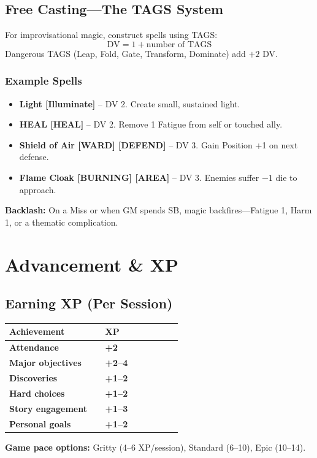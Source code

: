 \documentclass[10pt,twocolumn]{article} %
\begin{document}
\subsection{Free Casting---The TAGS System}
For improvisational magic, construct spells using TAGS:
\[
\text{DV} = 1 + \text{number of TAGS}
\]
Dangerous TAGS (Leap, Fold, Gate, Transform, Dominate) add $+2$ DV.

\subsubsection{Example Spells}
\begin{itemize}[leftmargin=*]
    \item \textbf{Light [Illuminate]} -- DV 2. Create small, sustained light.
    \item \textbf{HEAL [HEAL]} -- DV 2. Remove 1 Fatigue from self or touched ally.
    \item \textbf{Shield of Air [WARD] [DEFEND]} -- DV 3. Gain Position +1 on next defense.
    \item \textbf{Flame Cloak [BURNING] [AREA]} -- DV 3. Enemies suffer $-1$ die to approach.
\end{itemize}
\textbf{Backlash:} On a Miss or when GM spends SB, magic backfires---Fatigue 1, Harm 1, or a thematic complication.

\section{Advancement \& XP}

\subsection{Earning XP (Per Session)}
\begin{coretable}[XP Breakdown]
\begin{tabular}{>{\bfseries}p{0.5\linewidth} >{\bfseries}p{0.4\linewidth}}
\toprule
\textbf{Achievement} & \textbf{XP} \\
\midrule
Attendance & +2 \\
Major objectives & +2--4 \\
Discoveries & +1--2 \\
Hard choices & +1--2 \\
Story engagement & +1--3 \\
Personal goals & +1--2 \\
\bottomrule
\end{tabular}
\end{coretable}
\textbf{Game pace options:} Gritty (4--6 XP/session), Standard (6--10), Epic (10--14).
\end{document}
